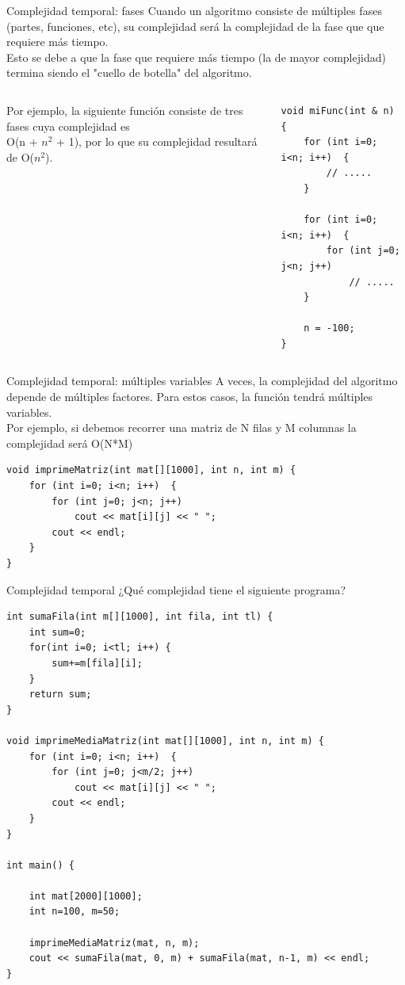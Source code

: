 \documentclass[12pt]{beamer}
\begin{document}
\begin{frame}[fragile]{Complejidad temporal: fases}
    Cuando un algoritmo consiste de múltiples fases (partes, funciones, etc), su complejidad será la complejidad de la \alert{fase que que requiere más tiempo}. \\
    Esto se debe a que la fase que requiere más tiempo (la de mayor complejidad) termina siendo el "cuello de botella" del algoritmo. \\
    \medskip
    \begin{columns}
        Por ejemplo, la siguiente función consiste de tres fases cuya complejidad es \\ O(n + $n^2$ + 1), por lo que su complejidad resultará de O($n^2$).
        \begin{lstlisting}[basicstyle=\tiny]
void miFunc(int & n) {
    for (int i=0; i<n; i++)  {
        // .....
    } 
    
    for (int i=0; i<n; i++)  {
        for (int j=0; j<n; j++)
            // .....
    }
    
    n = -100;
}
\end{lstlisting}
    \end{columns}
\end{frame}

\begin{frame}[fragile]{Complejidad temporal: múltiples variables}
    A veces, la complejidad del algoritmo depende de múltiples factores. Para estos casos, la función tendrá múltiples variables. \\
    \medskip
    Por ejemplo, si debemos recorrer una matriz de N filas y M columnas la complejidad será O(\alert{N*M})
\begin{lstlisting}[basicstyle=\scriptsize]
void imprimeMatriz(int mat[][1000], int n, int m) {
    for (int i=0; i<n; i++)  {
        for (int j=0; j<n; j++)
            cout << mat[i][j] << " ";
        cout << endl;
    }
}
\end{lstlisting}
\end{frame}

\begin{frame}[fragile]{Complejidad temporal}
    \centering ¿Qué complejidad tiene el siguiente programa? \\
    \medskip
\begin{lstlisting}[basicstyle=\tiny]
int sumaFila(int m[][1000], int fila, int tl) {
    int sum=0;
    for(int i=0; i<tl; i++) {
        sum+=m[fila][i];
    }
    return sum;
}

void imprimeMediaMatriz(int mat[][1000], int n, int m) {
    for (int i=0; i<n; i++)  {
        for (int j=0; j<m/2; j++)
            cout << mat[i][j] << " ";
        cout << endl;
    }
}

int main() {

    int mat[2000][1000];
    int n=100, m=50;
    
    imprimeMediaMatriz(mat, n, m);
    cout << sumaFila(mat, 0, m) + sumaFila(mat, n-1, m) << endl;
}
\end{lstlisting}
\end{frame}
\end{document}
